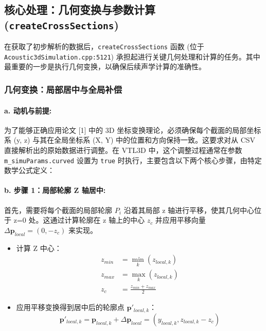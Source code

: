 \documentclass{ctexart}
\begin{document}
\subsection{核心处理：几何变换与参数计算 (\texttt{createCrossSections})}

在获取了初步解析的数据后，\texttt{createCrossSections} 函数 (位于 \texttt{Acoustic3dSimulation.cpp:5121}) 承担起进行关键几何处理和计算的任务。其中最重要的一步是执行几何变换，以确保后续声学计算的准确性。

\subsubsection{几何变换：局部居中与全局补偿}

\paragraph{a. 动机与前提:} 为了能够正确应用论文 [1] 中的 3D 坐标变换理论，必须确保每个截面的局部坐标系 (y, z) 与其在全局坐标系 (X, Y) 中的位置和方向保持一致。这要求对从 CSV 直接解析出的原始数据进行调整。在 VTL3D 中，这个调整过程通常在参数 \texttt{m\_simuParams.curved} 设置为 \texttt{true} 时执行，主要包含以下两个核心步骤，由特定数学公式定义：

\paragraph{b. 步骤 1：局部轮廓 Z 轴居中:} 首先，需要将每个截面的局部轮廓 \(P_i\) 沿着其局部 z 轴进行平移，使其几何中心位于 z=0 处。这通过计算轮廓在 z 轴上的中心 \(z_c\) 并应用平移向量 \(\Delta \mathbf{p}_{local} = (0, -z_c)\) 来实现。
\begin{itemize}
    \item 计算 Z 中心：
    \begin{align*}
        z_{min} &= \min_{k} (z_{local, k}) \\
        z_{max} &= \max_{k} (z_{local, k}) \\
        z_c &= \frac{z_{min} + z_{max}}{2}
    \end{align*}
    \item 应用平移变换得到居中后的轮廓点 \( \mathbf{p}'_{local, k} \)：
    \begin{equation} \label{eq:local_shift}
    \mathbf{p}'_{local, k} = \mathbf{p}_{local, k} + \Delta \mathbf{p}_{local} = (y_{local, k}, z_{local, k} - z_c)
    \end{equation}
\end{itemize}
\end{document}
